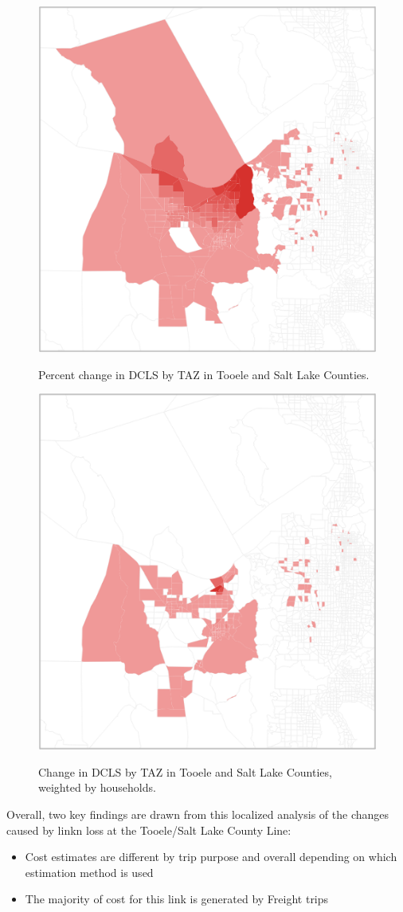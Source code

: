 \begin{figure}[H]
\begin{center}
{\centering \includegraphics[width=0.50\linewidth]{figures/chapter4/percentchangechoropleth.png}}

\caption{Percent change in DCLS by TAZ in Tooele and Salt Lake Counties.}
\label{fig:percentchangemap}
\end{center}
\end{figure}

\begin{figure}[H]
  \squeezeup
\begin{center}
{\centering \includegraphics[width=0.50\linewidth]{figures/chapter4/populationweightedchangechoropleth.png}}

\caption{Change in DCLS by TAZ in Tooele and Salt Lake Counties, weighted by households.}
\label{fig:hhmap}
\end{center}
\end{figure}

\squeezeup
\squeezeup
\squeezeup
\squeezeup
\squeezeup
\pagebreak
Overall, two key findings are drawn from this localized analysis of the changes caused by linkn loss at the Tooele/Salt Lake County Line:
\begin{itemize}
  \item Cost estimates are different by trip purpose and overall depending on
  which estimation method is used
  \item The majority of cost for this link is generated by Freight trips
\end{itemize}

